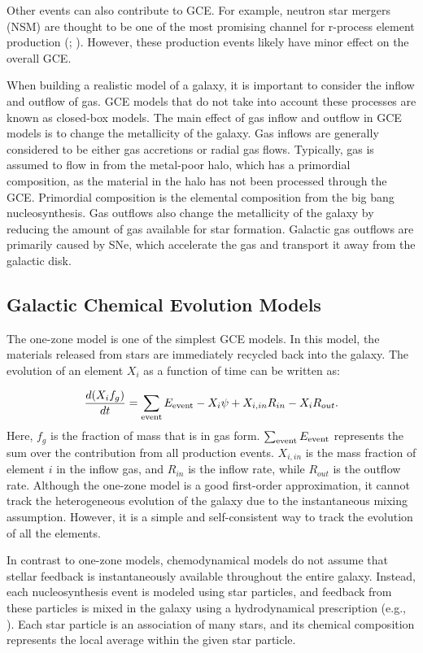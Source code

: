 \documentclass{brandeis-thesis3.2}
\begin{document}
Other events can also contribute to GCE. For example, neutron star mergers (NSM) are thought to be one of the most promising channel for r-process element production (\citealt{Korobkin_2012}; \citealt{Eichler_2015}). However, these production events likely have minor effect on the overall GCE. 

When building a realistic model of a galaxy, it is important to consider the inflow and outflow of gas. GCE models that do not take into account these processes are known as closed-box models. The main effect of gas inflow and outflow in GCE models is to change the metallicity of the galaxy. Gas inflows are generally considered to be either gas accretions or radial gas flows. Typically, gas is assumed to flow in from the metal-poor halo, which has a primordial composition, as the material in the halo has not been processed through the GCE. Primordial composition is the elemental composition from the big bang nucleosynthesis. Gas outflows also change the metallicity of the galaxy by reducing the amount of gas available for star formation. Galactic gas outflows are primarily caused by SNe, which accelerate the gas and transport it away from the galactic disk.

\subsection{Galactic Chemical Evolution Models}

The one-zone model is one of the simplest GCE models. In this model, the materials released from stars are immediately recycled back into the galaxy. The evolution of an element $X_i$ as a function of time can be written as:

\begin{equation}
\frac{d(X_if_g)}{dt} = \sum_{\rm event} E_{\rm event} - X_i\psi + X_{i, in}R_{in} - X_iR_{out}.
\end{equation}
Here, $f_g$ is the fraction of mass that is in gas form. $\sum_{\rm event} E_{\rm event}$ represents the sum over the contribution from all production events. $X_{i, in}$ is the mass fraction of element $i$ in the inflow gas, and $R_{in}$ is the inflow rate, while $R_{out}$ is the outflow rate. Although the one-zone model is a good first-order approximation, it cannot track the heterogeneous evolution of the galaxy due to the instantaneous mixing assumption. However, it is a simple and self-consistent way to track the evolution of all the elements.

In contrast to one-zone models, chemodynamical models do not assume that stellar feedback is instantaneously available throughout the entire galaxy. Instead, each nucleosynthesis event is modeled using star particles, and feedback from these particles is mixed in the galaxy using a hydrodynamical prescription (e.g., \citealt{Kobayashi_2015}). Each star particle is an association of many stars, and its chemical composition represents the local average within the given star particle. 
\end{document}
